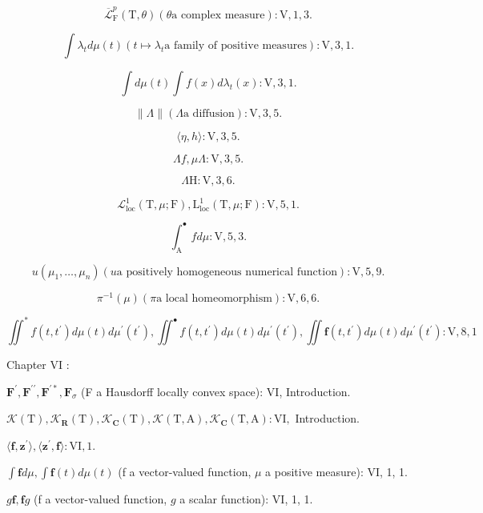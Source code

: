 \[
\overline {{\mathcal {L}}} _ {\mathrm{F}} ^ {p} (\mathrm{T}, \theta) (\theta \text {a complex measure}): \mathrm{V,1,3.}
\]

\[
\int \lambda_ {t} d \mu (t) (t \mapsto \lambda_ {t} \text {a family of positive measures}): \mathrm{V}, 3, 1.
\]

\[
\int d \mu (t) \int f (x) d \lambda_ {t} (x): \mathrm{V}, 3, 1.
\]

\[
\| \Lambda \| (\Lambda \text {a diffusion}): \mathrm{V}, 3, 5.
\]

\[
\langle \eta , h \rangle : \mathrm{V}, 3, 5.
\]

\[
\Lambda f, \mu \Lambda : \mathrm{V}, 3, 5.
\]

\[
\Lambda \mathrm{H}: \mathrm{V}, 3, 6.
\]

\[
\mathcal {L} _ {\mathrm{loc}} ^ {1} (\mathrm{T}, \mu ; \mathrm{F}), \mathrm{L} _ {\mathrm{loc}} ^ {1} (\mathrm{T}, \mu ; \mathrm{F}): \mathrm{V}, 5, 1.
\]

\[
\int_ {\mathrm{A}} ^ {\bullet} f d \mu : \mathrm{V}, 5, 3.
\]

\[
u (\mu_ {1}, \dots , \mu_ {n}) (u \text {a positively homogeneous numerical function}): \mathrm{V}, 5, 9.
\]

\[
\pi^ {- 1} (\mu) (\pi \text {a local homeomorphism}) \colon \mathrm{V,6,6.}
\]

\[
\iint^ {*} f (t, t ^ {\prime}) d \mu (t) d \mu^ {\prime} (t ^ {\prime}), \iint^ {\bullet} f (t, t ^ {\prime}) d \mu (t) d \mu^ {\prime} (t ^ {\prime}), \iint \mathbf {f} (t, t ^ {\prime}) d \mu (t) d \mu^ {\prime} (t ^ {\prime}): \mathrm{V}, 8, 1
\]

Chapter VI :

\(\mathbf{F}^{\prime},\mathbf{F}^{\prime \prime},\mathbf{F}^{\prime *},\mathbf{F}_{\sigma}\) (F a Hausdorff locally convex space): VI, Introduction.

\(\mathcal{K}(\mathrm{T}),\mathcal{K}_{\mathbf{R}}(\mathrm{T}),\mathcal{K}_{\mathbf{C}}(\mathrm{T}),\mathcal{K}(\mathrm{T},\mathrm{A}),\mathcal{K}_{\mathbf{C}}(\mathrm{T},\mathrm{A}):\mathrm{VI},\) Introduction.

\(\langle \mathbf{f},\mathbf{z}^{\prime}\rangle ,\langle \mathbf{z}^{\prime},\mathbf{f}\rangle :\mathrm{VI},1.\)

\(\int \mathbf{f} d\mu, \int \mathbf{f}(t) d\mu(t)\) (f a vector-valued function, \(\mu\) a positive measure): VI, 1, 1.

\(g\mathbf{f},\mathbf{f}g\) (f a vector-valued function, \(g\) a scalar function): VI, 1, 1.

